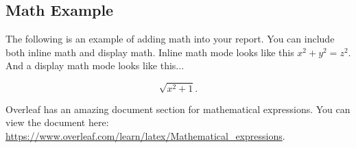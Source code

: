 \subsection{Math Example}

The following is an example of adding math into your report. You can include both inline math and display math. Inline math mode looks like this $x^2 + y^2 = z^2$. And a display math mode looks like this...

$$
\sqrt{x^2+1}.
$$

Overleaf has an amazing document section for mathematical expressions. You can view the document here: \url{https://www.overleaf.com/learn/latex/Mathematical_expressions}.
